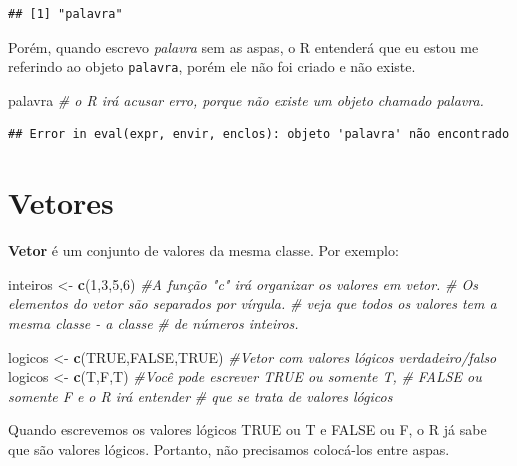 \documentclass[
]{book}
\newenvironment{Shaded}{\begin{snugshade}}{\end{snugshade}}
\newcommand{\CommentTok}[1]{\textcolor[rgb]{0.56,0.35,0.01}{\textit{#1}}}
\newcommand{\DecValTok}[1]{\textcolor[rgb]{0.00,0.00,0.81}{#1}}
\newcommand{\KeywordTok}[1]{\textcolor[rgb]{0.13,0.29,0.53}{\textbf{#1}}}
\newcommand{\NormalTok}[1]{#1}
\newcommand{\OtherTok}[1]{\textcolor[rgb]{0.56,0.35,0.01}{#1}}
\newcommand{\StringTok}[1]{\textcolor[rgb]{0.31,0.60,0.02}{#1}}
\begin{document}
\begin{verbatim}
## [1] "palavra"
\end{verbatim}

Porém, quando escrevo \emph{palavra} sem as aspas, o R entenderá que eu
estou me referindo ao objeto \texttt{palavra}, porém ele não foi criado
e não existe.

\begin{Shaded}
\begin{Highlighting}[]
\NormalTok{palavra        }\CommentTok{# o R irá acusar erro, porque não existe um objeto chamado palavra.}
\end{Highlighting}
\end{Shaded}

\begin{verbatim}
## Error in eval(expr, envir, enclos): objeto 'palavra' não encontrado
\end{verbatim}

\hypertarget{vetores}{%
\section{Vetores}\label{vetores}}

\textbf{Vetor} é um conjunto de valores da mesma classe. Por exemplo:

\begin{Shaded}
\begin{Highlighting}[]
\NormalTok{inteiros <-}\StringTok{ }\KeywordTok{c}\NormalTok{(}\DecValTok{1}\NormalTok{,}\DecValTok{3}\NormalTok{,}\DecValTok{5}\NormalTok{,}\DecValTok{6}\NormalTok{) }\CommentTok{#A função "c" irá organizar os valores em vetor. }
                       \CommentTok{# Os elementos do vetor são separados por vírgula.}
                      \CommentTok{# veja que todos os valores tem a mesma classe - a classe }
                      \CommentTok{# de números inteiros.}


\NormalTok{logicos <-}\StringTok{ }\KeywordTok{c}\NormalTok{(}\OtherTok{TRUE}\NormalTok{,}\OtherTok{FALSE}\NormalTok{,}\OtherTok{TRUE}\NormalTok{) }\CommentTok{#Vetor com valores lógicos verdadeiro/falso}
\NormalTok{logicos <-}\StringTok{ }\KeywordTok{c}\NormalTok{(T,F,T) }\CommentTok{#Você pode escrever TRUE ou somente T,  }
                    \CommentTok{# FALSE ou somente F e o R irá entender }
                    \CommentTok{# que se trata de valores lógicos}
\end{Highlighting}
\end{Shaded}

Quando escrevemos os valores lógicos TRUE ou T e FALSE ou F, o R já sabe
que são valores lógicos. Portanto, não precisamos colocá-los entre
aspas.
\end{document}
